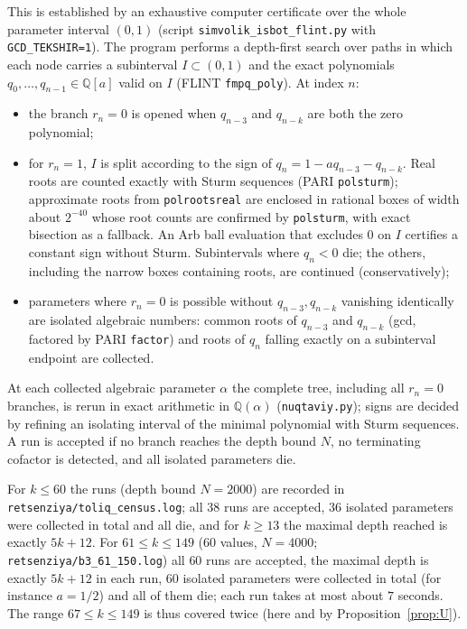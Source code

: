 \documentclass[11pt]{amsart}
\theoremstyle{definition}
\theoremstyle{remark}
\begin{document}
This is established by an exhaustive computer certificate over the whole parameter
interval $(0,1)$ (script \texttt{simvolik\_isbot\_flint.py} with
\texttt{GCD\_TEKSHIR=1}). The program performs a depth-first search over paths in
which each node carries a subinterval $I\subset(0,1)$ and the exact polynomials
$q_0,\dots,q_{n-1}\in\mathbb{Q}[a]$ valid on $I$ (FLINT \texttt{fmpq\_poly}).
At index $n$:
\begin{itemize}
\item the branch $r_n=0$ is opened when $q_{n-3}$ and $q_{n-k}$ are both the zero
polynomial;
\item for $r_n=1$, $I$ is split according to the sign of $q_n=1-aq_{n-3}-q_{n-k}$.
Real roots are counted exactly with Sturm sequences (PARI \texttt{polsturm});
approximate roots from \texttt{polrootsreal} are enclosed in rational boxes of
width about $2^{-40}$ whose root counts are confirmed by \texttt{polsturm}, with
exact bisection as a fallback. An Arb ball evaluation that excludes $0$ on $I$
certifies a constant sign without Sturm. Subintervals where $q_n<0$ die; the others,
including the narrow boxes containing roots, are continued (conservatively);
\item parameters where $r_n=0$ is possible without $q_{n-3},q_{n-k}$ vanishing
identically are isolated algebraic numbers: common roots of $q_{n-3}$ and $q_{n-k}$
(gcd, factored by PARI \texttt{factor}) and roots of $q_n$ falling exactly on a
subinterval endpoint are collected.
\end{itemize}
At each collected algebraic parameter $\alpha$ the complete tree, including all
$r_n=0$ branches, is rerun in exact arithmetic in $\mathbb{Q}(\alpha)$
(\texttt{nuqtaviy.py}); signs are decided by refining an isolating interval of the
minimal polynomial with Sturm sequences. A run is accepted if no branch reaches the
depth bound $N$, no terminating cofactor is detected, and all isolated parameters die.

For $k\le 60$ the runs (depth bound $N=2000$) are recorded in
\texttt{retsenziya/toliq\_census.log}; all $38$ runs are accepted, $36$ isolated
parameters were collected in total and all die, and for $k\ge 13$ the maximal depth
reached is exactly $5k+12$. For $61\le k\le 149$ ($60$ values,
$N=4000$; \texttt{retsenziya/b3\_61\_150.log}) all $60$ runs are accepted, the maximal
depth is exactly $5k+12$ in each run, $60$ isolated parameters were collected in total
(for instance $a=1/2$) and all of them die; each run takes at most about $7$ seconds.
The range $67\le k\le 149$ is thus covered twice (here and by
Proposition~\ref{prop:U}).
\end{document}
